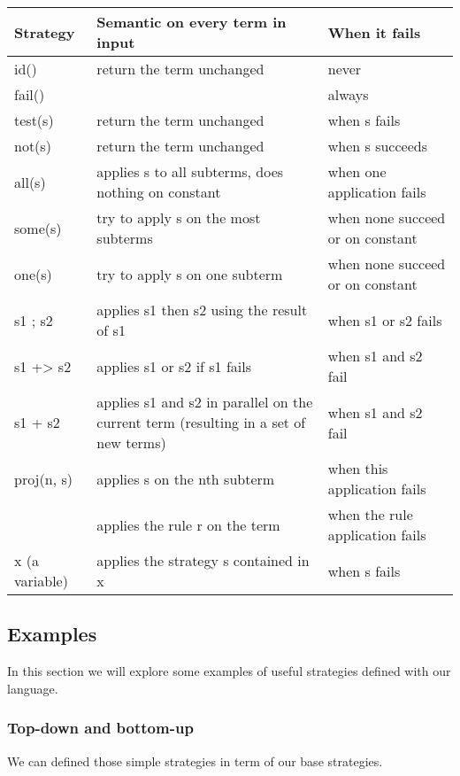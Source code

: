 \documentclass[12pt,a4paper]{article}
\begin{document}
\begin{center}
    \begin{tabular}{ | l | p{6cm} | p{4cm} |}
    \hline
    Strategy & Semantic on every term in input & When it fails \\ \hline
    id() & return the term unchanged & never \\ \hline
    fail() & & always \\ \hline
    test(s) & return the term unchanged & when s fails \\ \hline
    not(s) & return the term unchanged & when s succeeds \\ \hline
    all(s) & applies s to all subterms, does nothing on constant & when one 
    application fails \\ \hline
    some(s) & try to apply s on the most subterms & when none succeed or on constant 
    \\ \hline
    one(s) & try to apply s on one subterm & when none succeed or on constant 
    \\ \hline
    s1 ; s2 & applies s1 then s2 using the result of s1 & when s1 or s2 fails 
    \\ \hline
    s1 +> s2 & applies s1 or s2 if s1 fails & when s1 and s2 fail \\ \hline
    s1 + s2 & applies s1 and s2 in parallel on the current term 
      (resulting in a set of new terms) & when s1 and s2 fail \\ \hline 
    proj(n, s) & applies s on the nth subterm &
      when this application fails \\ \hline
    [r] & applies the rule r on the term & when the rule application fails \\ \hline
    x (a variable) & applies the strategy s contained in x & when s fails \\ \hline
    \end{tabular}
\end{center}
\subsection{Examples}
In this section we will explore some examples of useful strategies defined with our
language.

\subsubsection*{Top-down and bottom-up}
We can defined those simple strategies in term of our base strategies.
\end{document}
